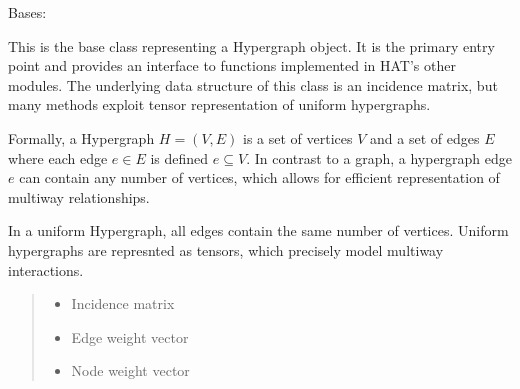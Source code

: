 \documentclass[letterpaper,10pt,english]{sphinxmanual}
\begin{document}
\begin{fulllineitems}
\label{\detokenize{HAT:HAT.Hypergraph.Hypergraph}}
\pysigstartsignatures
{}
\pysigstopsignatures
\sphinxAtStartPar
Bases: 

\sphinxAtStartPar
This is the base class representing a Hypergraph object. It is the primary entry point and
provides an interface to functions implemented in HAT’s other modules. The underlying data
structure of this class is an incidence matrix, but many methods exploit tensor representation
of uniform hypergraphs.

\sphinxAtStartPar
Formally, a Hypergraph \(H=(V,E)\) is a set of vertices \(V\) and a set of edges \(E\)
where each edge \(e\in E\) is defined \(e\subseteq V.\) In contrast to a graph, a hypergraph
edge \(e\) can contain any number of vertices, which allows for efficient representation of multi\sphinxhyphen{}way
relationships.

\sphinxAtStartPar
In a uniform Hypergraph, all edges contain the same number of vertices. Uniform hypergraphs are represnted
as tensors, which precisely model multi\sphinxhyphen{}way interactions.
\begin{quote}\begin{description}
\begin{itemize}
\item {} 
\sphinxAtStartPar
{} \textendash{} Incidence matrix

\item {} 
\sphinxAtStartPar
{} \textendash{} Edge weight vector

\item {} 
\sphinxAtStartPar
{} \textendash{} Node weight vector

\end{itemize}

\end{description}\end{quote}


\end{fulllineitems}
\end{document}
